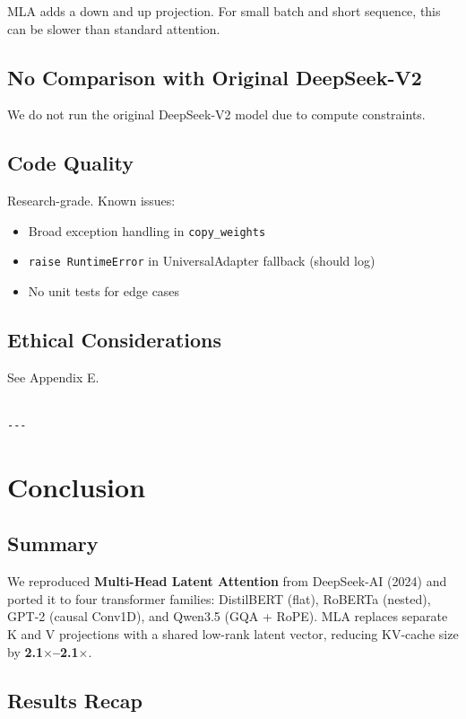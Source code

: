 MLA adds a down and up projection. For small batch and short sequence, this 
can be slower than standard attention.

\subsection{No Comparison with Original DeepSeek-V2}

We do not run the original DeepSeek-V2 model due to compute constraints.

\subsection{Code Quality}

Research-grade. Known issues:
\begin{itemize}
\item Broad exception handling in \texttt{copy\_weights}
\item \texttt{raise RuntimeError} in UniversalAdapter fallback (should log)
\item No unit tests for edge cases

\end{itemize}
\subsection{Ethical Considerations}

See Appendix E.
\begin{lstlisting}

---
\end{lstlisting}


\section{Conclusion}

\subsection{Summary}

We reproduced \textbf{Multi-Head Latent Attention} from DeepSeek-AI (2024) and 
ported it to four transformer families: DistilBERT (flat), RoBERTa 
(nested), GPT-2 (causal Conv1D), and Qwen3.5 (GQA + RoPE). MLA replaces 
separate K and V projections with a shared low-rank latent vector, 
reducing KV-cache size by \textbf{2.1$\times$--2.1$\times$}.

\subsection{Results Recap}

